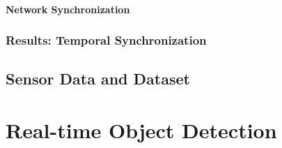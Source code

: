 \documentclass{erauthesis}
\begin{document}
\subsubsection{Network Synchronization} \label{time_sync_lan}


\subsection{Results: Temporal Synchronization} \label{results_time_sync_cam}


\section{Sensor Data and Dataset} \label{sec:sensor_data_dataset}




\chapter{Real-time Object Detection} \label{realtime_object_detection}
% 

% 







% 
\end{document}
